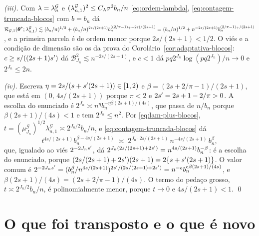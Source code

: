 \documentclass[11pt,a4paper]{article}
\newcommand{\Gcal}{\mathcal{G}}
\newcommand{\bn}{b_{n}}
\newcommand{\lamG}{\lambda^{\mathcal{G}}_{n}}
\newcommand{\lamGone}{\lambda^{\mathcal{G}}_{n,1}}
\begin{document}
\emph{(iii).} Com $\pen = \lamG$ e $(\lamGone)^{2} \le C_{\pen}\sigma^{2}\bn/n$
\eqref{eq:ordem-lambda}, \eqref{eq:contagem-truncada-blocos} com $b = \bn$
dá $\mathcal{R}_{\Gcal,1}(\thetastar;\lamGone) \lesssim (\bn/n)^{1/2} +
(\bn/n)^{2s/(2s+1)}\bn^{((2/\pi-1)_{+}-2s)/(2s+1)} = (\bn/n)^{1/2} +
n^{-2s/(2s+1)}\bn^{(2/\pi-1)_{+}/(2s+1)}$, e a primeira parcela é de ordem
menor porque $2s/(2s+1) < 1/2$. O viés e a condição de dimensão são os da
prova do Corolário~\ref{cor:adaptativa-blocos}: $c \ge s/((2s+1)s')$ dá
$\mathcal{B}_{J_{n}}^{2} \lesssim n^{-2s/(2s+1)}$, e $c < 1$ dá
$pq2^{J_{n}}\log(pq2^{J_{n}})/n \to 0$ e $2^{J_{n}} \le 2n$.

\emph{(iv).} Escreva $\eta = 2s/(s+s'(2s+1)) \in [1,2)$ e $\beta =
(2s+2/\pi-1)/(2s+1)$, que está em $(0,\, 4s/(2s+1))$ porque $\pi < 2$ e
$2s' = 2s+1-2/\pi > 0$. A escolha do enunciado é $2^{J_{n}} \asymp
n^{\eta}\bn^{-\eta\beta(2s+1)/(4s)}$, que passa de $n/\bn$ porque
$\beta(2s+1)/(4s) < 1$ e tem $2^{J_{n}} \le n^{2}$. Por
\eqref{eq:lam-plus-blocos}, $t = (\mu^{\Gcal}_{J_{n}})^{1/2}\lamGone \asymp
2^{J_{n}/2}\bn/n$, e \eqref{eq:contagem-truncada-blocos} dá
\[
  t^{4s/(2s+1)}\bn^{\beta - 4s/(2s+1)}
  \;\asymp\; 2^{J_{n}\cdot 2s/(2s+1)}\,n^{-4s/(2s+1)}\,\bn^{\beta},
\]
que, igualado ao viés $2^{-2J_{n}s'}$, dá $2^{J_{n}(2s/(2s+1)+2\seff)} =
n^{4s/(2s+1)}\bn^{-\beta}$: é a escolha do enunciado, porque
$(2s/(2s+1) + 2s')(2s+1) = 2\{s + s'(2s+1)\}$. O valor comum é
$2^{-2J_{n}\seff} = (\bn^{\beta}/n^{4s/(2s+1)})^{2\seff/(2s/(2s+1)+2\seff)} =
n^{-e}\bn^{e\beta(2s+1)/(4s)}$, e $\beta(2s+1)/(4s) = (2s+2/\pi-1)/(4s)$. O
termo do pedaço grosso, $t \asymp 2^{J_{n}/2}\bn/n$, é polinomialmente menor,
porque $t \to 0$ e $4s/(2s+1) < 1$. \qed

\section{O que foi transposto e o que é novo}
\end{document}
